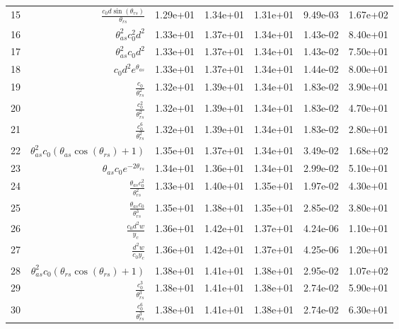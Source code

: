 \begin{tabularx}{\textwidth}{lRRRRRl}
15  &  $ \displaystyle\frac{c_{0} d \sin{\left(\theta_{rs} \right)}}{\theta_{rs}} $  &  1.29e+01  &  1.34e+01  &  1.31e+01  &  9.49e-03  &  1.67e+02  \\ 
16  &  $ \theta_{as}^{2} c_{0}^{2} d^{2} $  &  1.33e+01  &  1.37e+01  &  1.34e+01  &  1.43e-02  &  8.40e+01  \\ 
17  &  $ \theta_{as}^{2} c_{0} d^{2} $  &  1.33e+01  &  1.37e+01  &  1.34e+01  &  1.43e-02  &  7.50e+01  \\ 
18  &  $ c_{0} d^{2} e^{\theta_{as}} $  &  1.33e+01  &  1.37e+01  &  1.34e+01  &  1.44e-02  &  8.00e+01  \\ 
19  &  $ \displaystyle\frac{c_{0}}{\theta_{rs}^{2}} $  &  1.32e+01  &  1.39e+01  &  1.34e+01  &  1.83e-02  &  3.90e+01  \\ 
20  &  $ \displaystyle\frac{c_{0}^{2}}{\theta_{rs}^{2}} $  &  1.32e+01  &  1.39e+01  &  1.34e+01  &  1.83e-02  &  4.70e+01  \\ 
21  &  $ \displaystyle\frac{c_{0}^{6}}{\theta_{rs}^{2}} $  &  1.32e+01  &  1.39e+01  &  1.34e+01  &  1.83e-02  &  2.80e+01  \\ 
22  &  $ \theta_{as}^{2} c_{0} \left(\theta_{as} \cos{\left(\theta_{rs} \right)} + 1\right) $  &  1.35e+01  &  1.37e+01  &  1.34e+01  &  3.49e-02  &  1.68e+02  \\ 
23  &  $ \theta_{as} c_{0} e^{- 2 \theta_{rs}} $  &  1.34e+01  &  1.36e+01  &  1.34e+01  &  2.99e-02  &  5.10e+01  \\ 
24  &  $ \displaystyle\frac{\theta_{as} c_{0}^{2}}{\theta_{rs}^{2}} $  &  1.33e+01  &  1.40e+01  &  1.35e+01  &  1.97e-02  &  4.30e+01  \\ 
25  &  $ \displaystyle\frac{\theta_{as} c_{0}}{\theta_{rs}^{3}} $  &  1.35e+01  &  1.38e+01  &  1.35e+01  &  2.85e-02  &  3.80e+01  \\ 
26  &  $ \displaystyle\frac{c_{0} d^{2} w}{y_c} $  &  1.36e+01  &  1.42e+01  &  1.37e+01  &  4.24e-06  &  1.10e+01  \\ 
27  &  $ \displaystyle\frac{d^{2} w}{c_{0} y_c} $  &  1.36e+01  &  1.42e+01  &  1.37e+01  &  4.25e-06  &  1.20e+01  \\ 
28  &  $ \theta_{as}^{2} c_{0} \left(\theta_{rs} \cos{\left(\theta_{rs} \right)} + 1\right) $  &  1.38e+01  &  1.41e+01  &  1.38e+01  &  2.95e-02  &  1.07e+02  \\ 
29  &  $ \displaystyle\frac{c_{0}^{3}}{\theta_{rs}^{3}} $  &  1.38e+01  &  1.41e+01  &  1.38e+01  &  2.74e-02  &  5.90e+01  \\ 
30  &  $ \displaystyle\frac{c_{0}^{6}}{\theta_{rs}^{3}} $  &  1.38e+01  &  1.41e+01  &  1.38e+01  &  2.74e-02  &  6.30e+01  \\ 

\end{tabularx}
